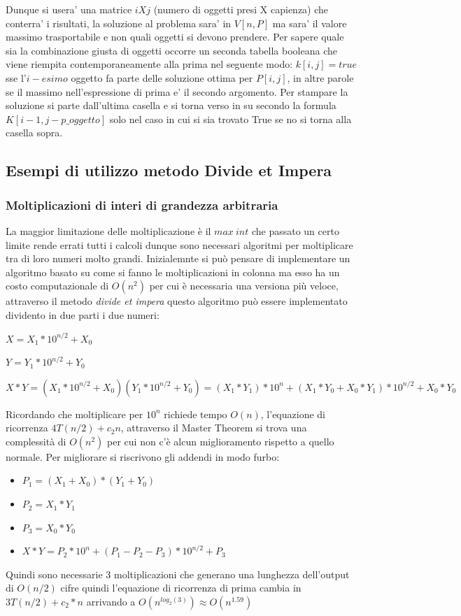 \documentclass{article}
\begin{document}
Dunque si usera' una matrice $i X j$ (numero di oggetti presi X capienza) che conterra' i risultati, la soluzione al problema sara' in $V[n,P]$ ma sara' il valore massimo trasportabile e non quali oggetti si devono prendere.
Per sapere quale sia la combinazione giusta di oggetti occorre un seconda tabella booleana che viene riempita contemporaneamente alla prima nel seguente modo:
$k[i,j] = true$ sse l'$i-esimo$ oggetto fa parte delle soluzione ottima per $P[i,j]$, in altre parole se il massimo nell'espressione di prima e' il secondo argomento.
Per stampare la soluzione si parte dall'ultima casella e si torna verso in su secondo la formula $K[i-1, j-p\_oggetto]$ solo nel caso in cui si sia trovato True se no si torna alla casella sopra.

\subsection{Esempi di utilizzo metodo Divide et Impera}
\subsubsection{Moltiplicazioni di interi di grandezza arbitraria}
La maggior limitazione delle moltiplicazione è il $max\ int$ che passato un certo limite rende errati tutti i calcoli dunque sono necessari algoritmi per moltiplicare tra di loro numeri molto grandi. 
Inizialemnte si può pensare di implementare un algoritmo basato su come si fanno le moltiplicazioni in colonna ma esso ha un costo computazionale di $O(n^2)$ per cui è necessaria una versiona più veloce, 
attraverso il metodo \textit{divide et impera} questo algoritmo può essere implementato dividento in due parti i due numeri:
\begin{center}
    $X=X_1*10^{n/2} + X_0$

    $Y=Y_1*10^{n/2} + Y_0$

    $X*Y = (X_1*10^{n/2} + X_0) (Y_1*10^{n/2} + Y_0) = (X_1*Y_1)* 10^{n} + (X_1*Y_0 + X_0 * Y_1)*10^{n/2} + X_0*Y_0$
\end{center}

Ricordando che moltiplicare per $10^n$ richiede tempo $O(n)$, l'equazione di ricorrenza $4T(n/2) + c_2n$, 
attraverso il Master Theorem si trova una complessità di $O(n^2)$ per cui non c'è alcun miglioramento rispetto a quello normale.
Per migliorare si riscrivono gli addendi in modo furbo:
\begin{itemize}
    \item $P_1 = (X_1+X_0)*(Y_1+Y_0)$
    \item $P_2 = X_1*Y_1$
    \item $P_3 = X_0*Y_0$
    \item $X*Y = P_2*10^n + (P_1-P_2-P_3)*10^{n/2}+P_3$
\end{itemize}
Quindi sono necessarie 3 moltiplicazioni che generano una lunghezza dell'output di $O(n/2)$ cifre 
quindi l'equazione di ricorrenza di prima cambia in $3T(n/2)+c_2*n$ arrivando a $O(n^{log_2(3)}) \approx O(n^{1.59})$
\end{document}

